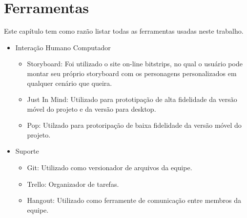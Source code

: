 \chapter[Ferramentas]{Ferramentas}

Este capítulo tem como razão listar todas as ferramentas usadas neste trabalho.

\begin{itemize}
	\item Interação Humano Computador
	\begin {itemize}
		\item Storyboard: Foi utilizado o site on-line bitstrips\nocite{website:bitstrips}, no qual o usuário pode montar seu próprio storyboard com os personagens personalizados em qualquer cenário que queira.
		\item Just In Mind: Utilizado para prototipação de alta fidelidade da versão móvel do projeto e da versão para desktop.
		\item Pop: Utilzado para protoripação de baixa fidelidade da versão móvel do projeto.
	\end {itemize}
	
	\item Suporte
	\begin {itemize}
		\item Git: Utilizado como versionador de arquivos da equipe.
		\item Trello: Organizador de tarefas.\nocite{website:Trello}
		\item Hangout: Utilizado como ferramente de comunicação entre membros da equipe.
	\end {itemize}
\end{itemize}


